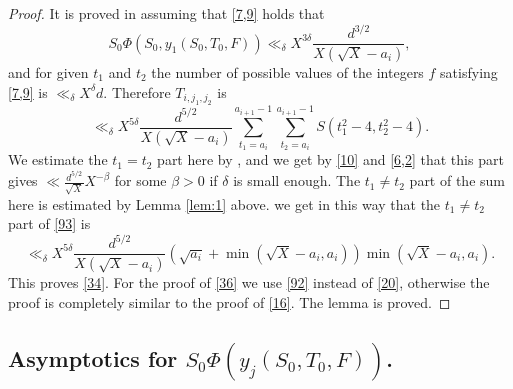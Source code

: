 \documentclass[12pt]{amsart}
\theoremstyle{definition}
\numberwithin{equation}{section}
\begin{document}
\begin{proof}It is proved in \cite[Subsection
6.8]{Biro} assuming that \eqref{7,9} holds that
\begin{equation}S_0\Phi\left(S_0,y_1\left(S_0,T_0,F\right)\right)
\ll_{\delta}X^{3\delta}\frac {d^{3/2}}{X\left(\sqrt {X}-a_i\right
)},\label{92}\end{equation}
and for given $t_1$ and $t_2$ the number of possible values of the integers $
f$
satisfying \eqref{7,9} is $\ll_{\delta}X^{\delta}d$. Therefore $T_{
i,j_1,j_2}$ is
\begin{equation}\ll_{\delta}X^{5\delta}\frac {d^{5/2}}{X\left(\sqrt {
X}-a_i\right)}\sum_{t_1=a_i}^{a_{i+1}-1}\sum_{t_2=a_i}^{a_{i+1}-1}
S\left(t^2_1-4,t^2_2-4\right).\label{93}\end{equation}
We estimate the $t_1=t_2$ part here by \cite[(3.22)]{Biro}, and
we get by \eqref{10} and \eqref{6,2} that this part gives
$\ll\frac {d^{5/2}}{\sqrt {X}}X^{-\beta}$ for some $\beta >0$ if $
\delta$ is small enough. The $t_1\neq t_2$
part of the sum here is estimated by Lemma \ref{lem:1}
above. we get in this way that the $t_1\neq t_2$ part of
\eqref{93} is
\[\ll_{\delta}X^{5\delta}\frac {d^{5/2}}{X\left(\sqrt {X}-a_i\right
)}\left(\sqrt {a_i}+\min\left(\sqrt {X}-a_i,a_i\right)\right)\min\left
(\sqrt {X}-a_i,a_i\right).\]
This proves \eqref{34}. For the proof of \eqref{36} we
use \eqref{92} instead of \eqref{20}, otherwise the proof is completely similar
to the proof of \eqref{16}. The lemma is proved.
\end{proof}




\subsection{Asymptotics for $S_0\Phi\left(y_j\left(S_0,T_0,F\right)\right)$.}
\end{document}
